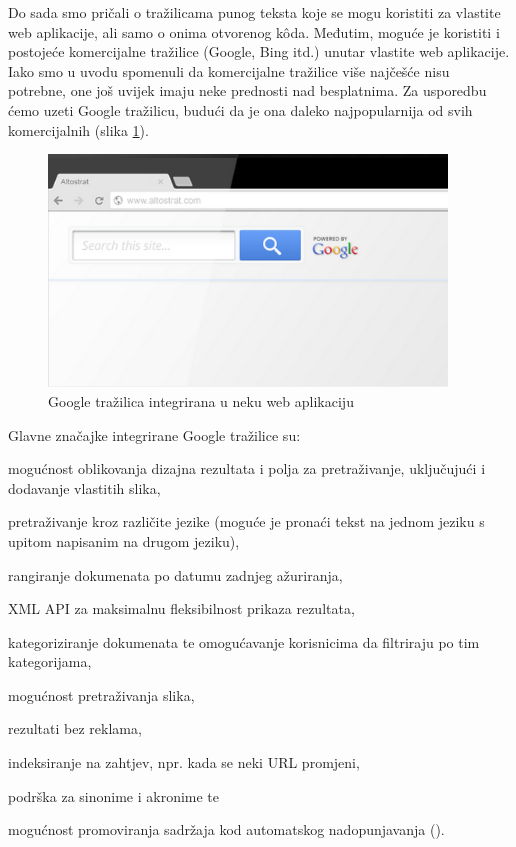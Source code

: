 \documentclass[a4paper,twoside,12pt]{scrreprt}
\begin{document}
Do sada smo pričali o tražilicama punog teksta koje se mogu koristiti za vlastite web aplikacije, ali samo o onima otvorenog kôda. Međutim, moguće je koristiti i postojeće komercijalne tražilice (Google, Bing itd.) unutar vlastite web aplikacije. Iako smo u uvodu spomenuli da komercijalne tražilice više najčešće nisu potrebne, one još uvijek imaju neke prednosti nad besplatnima. Za usporedbu ćemo uzeti Google tražilicu, budući da je ona daleko najpopularnija od svih komercijalnih (slika \ref{google}).

\begin{figure}[H]
  \centering
  \includegraphics[width=300pt]{google}
  \caption{Google tražilica integrirana u neku web aplikaciju}
  \label{google}
\end{figure}

Glavne značajke integrirane Google tražilice su:

\begin{compactitem}
  \item mogućnost oblikovanja dizajna rezultata i polja za pretraživanje, uključujući i dodavanje vlastitih slika,
  \item pretraživanje kroz različite jezike (moguće je pronaći tekst na jednom jeziku s upitom napisanim na drugom jeziku),
  \item rangiranje dokumenata po datumu zadnjeg ažuriranja,
  \item XML API za maksimalnu fleksibilnost prikaza rezultata,
  \item kategoriziranje dokumenata te omogućavanje korisnicima da filtriraju po tim kategorijama,
  \item mogućnost pretraživanja slika,
  \item rezultati bez reklama,
  \item indeksiranje na zahtjev, npr. kada se neki URL promjeni,
  \item podrška za sinonime i akronime te
  \item mogućnost promoviranja sadržaja kod automatskog nadopunjavanja (\cite{google}).
\end{compactitem}
\end{document}
